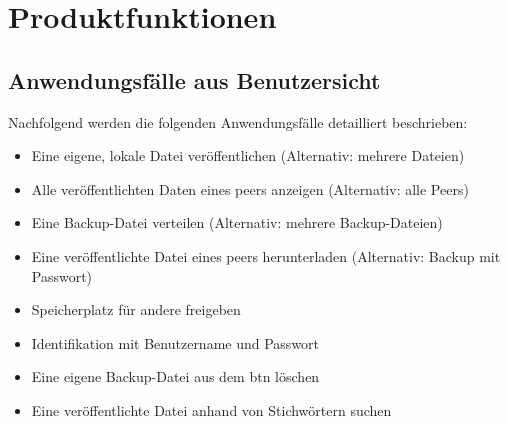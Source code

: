 \section{Produktfunktionen}

\subsection{Anwendungsfälle aus Benutzersicht}
\label{sec:usecaseuser}

Nachfolgend werden die folgenden Anwendungsfälle detailliert beschrieben: 
\begin{itemize}
	\item Eine eigene, lokale Datei veröffentlichen (Alternativ: mehrere Dateien)
	\item Alle veröffentlichten Daten eines \gls{peer}s anzeigen (Alternativ: alle Peers)
	\item Eine Backup-Datei verteilen (Alternativ: mehrere Backup-Dateien)
	\item Eine veröffentlichte Datei eines \gls{peer}s herunterladen (Alternativ: Backup mit Passwort)
	\item Speicherplatz für andere freigeben
	\item Identifikation mit Benutzername und Passwort
	\item Eine eigene Backup-Datei aus dem \gls{btn} löschen
	\item Eine veröffentlichte Datei anhand von Stichwörtern suchen
\end{itemize}

